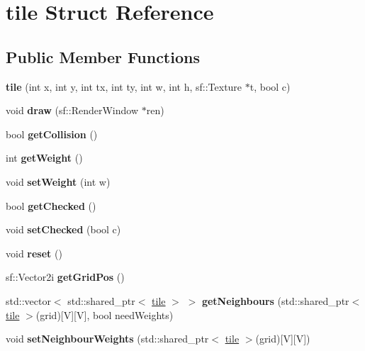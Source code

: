 \hypertarget{structtile}{}\section{tile Struct Reference}
\label{structtile}
\subsection*{Public Member Functions}
\begin{DoxyCompactItemize}
\item 
\mbox{\label{structtile_a3927c0ca3463b84abacd5615aabcd1b2}} 
{\bfseries tile} (int x, int y, int tx, int ty, int w, int h, sf\+::\+Texture $\ast$t, bool c)
\item 
\mbox{\label{structtile_af76e6ed1fd19cf4fd0f26fb273bb0852}} 
void {\bfseries draw} (sf\+::\+Render\+Window $\ast$ren)
\item 
\mbox{\label{structtile_a0881ee62ef6a90d1a2899b99803d2eb4}} 
bool {\bfseries get\+Collision} ()
\item 
\mbox{\label{structtile_a5118e41b162430b46b9646346cf4029d}} 
int {\bfseries get\+Weight} ()
\item 
\mbox{\label{structtile_a218fcbab9706a6a98674250dc8377025}} 
void {\bfseries set\+Weight} (int w)
\item 
\mbox{\label{structtile_a1864ec49fa40572064813045ec70b738}} 
bool {\bfseries get\+Checked} ()
\item 
\mbox{\label{structtile_a8cd764dd3895e6f1d6e760b1da684142}} 
void {\bfseries set\+Checked} (bool c)
\item 
\mbox{\label{structtile_aba60d5f88c2433a0c684b2fd3e9b923c}} 
void {\bfseries reset} ()
\item 
\mbox{\label{structtile_a884491e78977db7772c5fce6a351b11d}} 
sf\+::\+Vector2i {\bfseries get\+Grid\+Pos} ()
\item 
\mbox{\label{structtile_a5ec9322c1ddb1422d5a8a1774149132f}} 
std\+::vector$<$ std\+::shared\+\_\+ptr$<$ \mbox{\hyperlink{structtile}{tile}} $>$ $>$ {\bfseries get\+Neighbours} (std\+::shared\+\_\+ptr$<$ \mbox{\hyperlink{structtile}{tile}} $>$(grid)\mbox{[}V\mbox{]}\mbox{[}V\mbox{]}, bool need\+Weights)
\item 
\mbox{\label{structtile_a532b7b9a29a56591bdc4288ea31d578f}} 
void {\bfseries set\+Neighbour\+Weights} (std\+::shared\+\_\+ptr$<$ \mbox{\hyperlink{structtile}{tile}} $>$(grid)\mbox{[}V\mbox{]}\mbox{[}V\mbox{]})
\end{DoxyCompactItemize}
